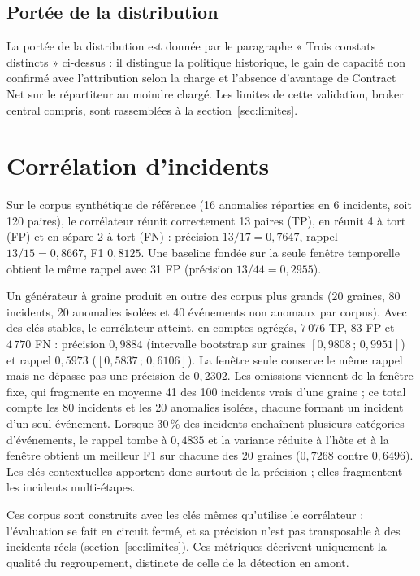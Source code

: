 \subsection{Portée de la distribution}

La portée de la distribution est donnée par le paragraphe « Trois constats distincts » ci-dessus : il distingue la politique historique, le gain de capacité non confirmé avec l'attribution selon la charge et l'absence d'avantage de Contract Net sur le répartiteur au moindre chargé. Les limites de cette validation, broker central compris, sont rassemblées à la section~\ref{sec:limites}.

\section{Corrélation d’incidents}
\label{sec:correlation-resultats}

Sur le corpus synthétique de référence (16 anomalies réparties en 6 incidents, soit 120 paires), le corrélateur réunit correctement 13 paires (TP), en réunit 4 à tort (FP) et en sépare 2 à tort (FN) : précision $13/17 = 0{,}7647$, rappel $13/15 = 0{,}8667$, F1 $0{,}8125$. Une baseline fondée sur la seule fenêtre temporelle obtient le même rappel avec 31 FP (précision $13/44 = 0{,}2955$).

Un générateur à graine produit en outre des corpus plus grands (20 graines, 80 incidents, 20 anomalies isolées et 40 événements non anomaux par corpus). Avec des clés stables, le corrélateur atteint, en comptes agrégés, $7\,076$ TP, 83 FP et $4\,770$ FN : précision $0{,}9884$ (intervalle bootstrap sur graines $[0{,}9808\,;\,0{,}9951]$) et rappel $0{,}5973$ ($[0{,}5837\,;\,0{,}6106]$). La fenêtre seule conserve le même rappel mais ne dépasse pas une précision de $0{,}2302$. Les omissions viennent de la fenêtre fixe, qui fragmente en moyenne 41 des 100 incidents vrais d’une graine ; ce total compte les 80 incidents et les 20 anomalies isolées, chacune formant un incident d'un seul événement. Lorsque 30\,\% des incidents enchaînent plusieurs catégories d’événements, le rappel tombe à $0{,}4835$ et la variante réduite à l’hôte et à la fenêtre obtient un meilleur F1 sur chacune des 20 graines ($0{,}7268$ contre $0{,}6496$). Les clés contextuelles apportent donc surtout de la précision ; elles fragmentent les incidents multi-étapes.

Ces corpus sont construits avec les clés mêmes qu'utilise le corrélateur : l'évaluation se fait en circuit fermé, et sa précision n'est pas transposable à des incidents réels (section~\ref{sec:limites}). Ces métriques décrivent uniquement la qualité du regroupement, distincte de celle de la détection en amont.

